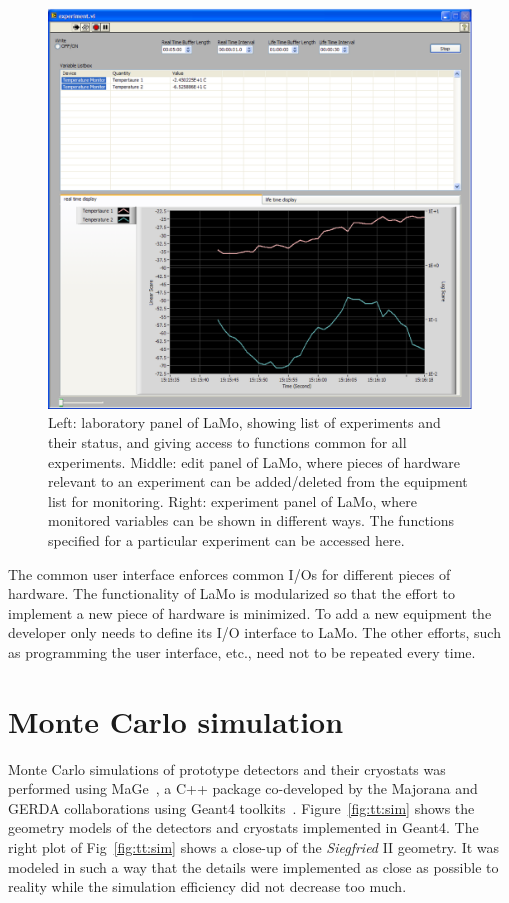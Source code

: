 \begin{figure}[tbhp]
  \includegraphics[height=0.23\textheight]{LaMoExp}
  \caption{Left: laboratory panel of LaMo, showing list of experiments     and their status, and giving access to functions common for all     experiments. Middle: edit panel of LaMo, where pieces of hardware     relevant to an experiment can be added/deleted from the equipment     list for monitoring. Right: experiment panel of LaMo, where     monitored variables can be shown in different ways. The functions     specified for a particular experiment can be accessed here.}
  \label{fig:tt:lamo}
\end{figure}

The common user interface enforces common I/Os for different pieces of hardware. The functionality of LaMo is modularized so that the effort to implement a new piece of hardware is minimized. To add a new equipment the developer only needs to define its I/O interface to LaMo. The other efforts, such as programming the user interface, etc., need not to be repeated every time.

\section{Monte Carlo simulation} 
\label{sec:tt:sim}
Monte Carlo simulations of prototype detectors and their cryostats was performed using MaGe~\cite{Mag08}, a C++ package co-developed by the Majorana and GERDA collaborations using Geant4 toolkits~\cite{Gea03,Gea06}. Figure~\ref{fig:tt:sim} shows the geometry models of the detectors and cryostats implemented in Geant4. The right plot of Fig~\ref{fig:tt:sim} shows a close-up of the \emph{Siegfried} II geometry. It was modeled in such a way that the details were implemented as close as possible to reality while the simulation efficiency did not decrease too much.

